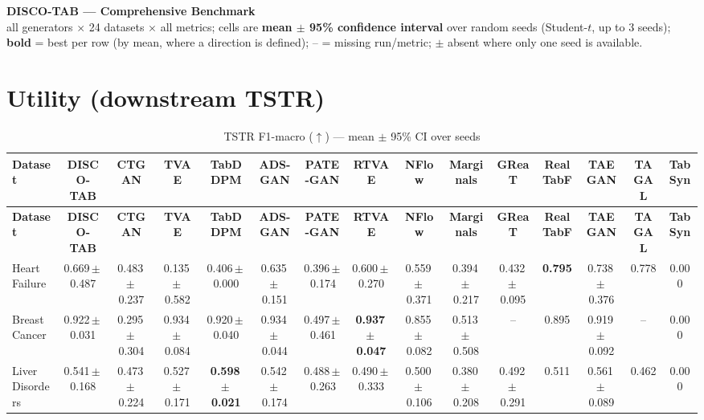 \documentclass[8pt]{extarticle}
\begin{document}
\begin{center}{\Large\textbf{DISCO-TAB --- Comprehensive Benchmark}}\\[2pt]
all generators $\times$ 24 datasets $\times$ all metrics; cells are
\textbf{mean $\pm$ 95\% confidence interval} over random seeds (Student-$t$,
up to 3 seeds); \textbf{bold} = best per row (by mean, where a direction is
defined); -- = missing run/metric; $\pm$ absent where only one seed is available.
\end{center}
\scriptsize

\section*{Utility (downstream TSTR)}
\begin{longtable}{l*{14}{c}}
\caption{TSTR F1-macro ($\uparrow$) --- mean $\pm$ 95\% CI over seeds}\\
\toprule
\textbf{Dataset} & \textbf{DISCO-TAB} & \textbf{CTGAN} & \textbf{TVAE} & \textbf{TabDDPM} & \textbf{ADS-GAN} & \textbf{PATE-GAN} & \textbf{RTVAE} & \textbf{NFlow} & \textbf{Marginals} & \textbf{GReaT} & \textbf{RealTabF} & \textbf{TAEGAN} & \textbf{TAGAL} & \textbf{TabSyn} \\
\midrule
\endfirsthead
\toprule
\textbf{Dataset} & \textbf{DISCO-TAB} & \textbf{CTGAN} & \textbf{TVAE} & \textbf{TabDDPM} & \textbf{ADS-GAN} & \textbf{PATE-GAN} & \textbf{RTVAE} & \textbf{NFlow} & \textbf{Marginals} & \textbf{GReaT} & \textbf{RealTabF} & \textbf{TAEGAN} & \textbf{TAGAL} & \textbf{TabSyn} \\
\midrule
\endhead
\bottomrule
\endfoot
Heart Failure & 0.669\,$\pm$\,0.487 & 0.483\,$\pm$\,0.237 & 0.135\,$\pm$\,0.582 & 0.406\,$\pm$\,0.000 & 0.635\,$\pm$\,0.151 & 0.396\,$\pm$\,0.174 & 0.600\,$\pm$\,0.270 & 0.559\,$\pm$\,0.371 & 0.394\,$\pm$\,0.217 & 0.432\,$\pm$\,0.095 & \textbf{0.795} & 0.738\,$\pm$\,0.376 & 0.778 & 0.000 \\
Breast Cancer & 0.922\,$\pm$\,0.031 & 0.295\,$\pm$\,0.304 & 0.934\,$\pm$\,0.084 & 0.920\,$\pm$\,0.040 & 0.934\,$\pm$\,0.044 & 0.497\,$\pm$\,0.461 & \textbf{0.937\,$\pm$\,0.047} & 0.855\,$\pm$\,0.082 & 0.513\,$\pm$\,0.508 & -- & 0.895 & 0.919\,$\pm$\,0.092 & -- & 0.000 \\
Liver Disorders & 0.541\,$\pm$\,0.168 & 0.473\,$\pm$\,0.224 & 0.527\,$\pm$\,0.171 & \textbf{0.598\,$\pm$\,0.021} & 0.542\,$\pm$\,0.174 & 0.488\,$\pm$\,0.263 & 0.490\,$\pm$\,0.333 & 0.500\,$\pm$\,0.106 & 0.380\,$\pm$\,0.208 & 0.492\,$\pm$\,0.291 & 0.511 & 0.561\,$\pm$\,0.089 & 0.462 & 0.000 \\

\end{longtable}
\end{document}
